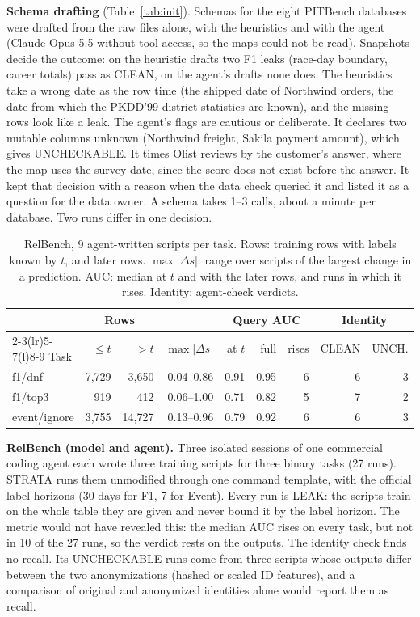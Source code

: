 \documentclass[10pt,conference]{IEEEtran}
\newcommand{\tool}{STRATA}
\begin{document}
\textbf{Schema drafting} (Table~\ref{tab:init}). Schemas for the eight
PITBench databases were drafted from the raw files alone, with the
heuristics and with the agent (Claude Opus 5.5 without tool access, so the
maps could not be read). Snapshots decide the outcome: on the heuristic
drafts two F1 leaks (race-day boundary, career totals) pass as
CLEAN, on the agent's drafts none does. The heuristics take a wrong date as the row time
(the shipped date of Northwind orders, the date from which the PKDD'99
district statistics are known), and the missing rows look like a leak. The
agent's flags are cautious or deliberate. It declares two mutable columns
unknown (Northwind freight, Sakila payment amount), which gives
UNCHECKABLE. It times Olist reviews by the customer's answer, where the map
uses the survey date, since the score does not exist before the answer.
It kept that decision with a reason when the data check queried it and
listed it as a question for the data owner. A schema takes 1--3 calls, about
a minute per database. Two runs differ in one decision.

\begin{table}[t]
\centering\footnotesize
\setlength{\tabcolsep}{2.6pt}
\caption{RelBench, 9 agent-written scripts per task. Rows: training rows
with labels known by $t$, and later rows. $\max|\Delta s|$: range over
scripts of the largest change in a prediction. AUC: median at $t$ and with
the later rows, and runs in which it rises. Identity: agent-check verdicts.}
\label{tab:relbench}
\begin{tabular}{@{}lrrrrrrrr@{}}
\toprule
& \multicolumn{2}{c}{Rows} & & \multicolumn{3}{c}{Query AUC} & \multicolumn{2}{c}{Identity} \\
\cmidrule(lr){2-3}\cmidrule(lr){5-7}\cmidrule(l){8-9}
Task & $\le t$ & $>t$ & $\max|\Delta s|$ & at $t$ & full & rises & CLEAN & UNCH. \\
\midrule
f1/dnf       & 7{,}729 & 3{,}650  & 0.04--0.86 & 0.91 & 0.95 & 6 & 6 & 3 \\
f1/top3      & 919     & 412      & 0.06--1.00 & 0.71 & 0.82 & 5 & 7 & 2 \\
event/ignore & 3{,}755 & 14{,}727 & 0.13--0.96 & 0.79 & 0.92 & 6 & 6 & 3 \\
\bottomrule
\end{tabular}
\end{table}

\textbf{RelBench (model and agent).} Three isolated sessions of one
commercial coding agent each wrote three training scripts for three binary
tasks (27 runs). \tool{} runs them unmodified through one command template,
with the official label horizons (30 days for F1, 7 for Event).
Every run is LEAK: the scripts train on the whole table they are given and never
bound it by the label horizon. The metric would not have revealed this: the
median AUC rises on every task, but not in 10 of the 27 runs, so the verdict
rests on the outputs. The identity check finds no
recall. Its UNCHECKABLE runs come from three scripts whose outputs
differ between the two anonymizations (hashed or scaled ID features), and a
comparison of original and anonymized identities alone would report them
as recall.
\end{document}
